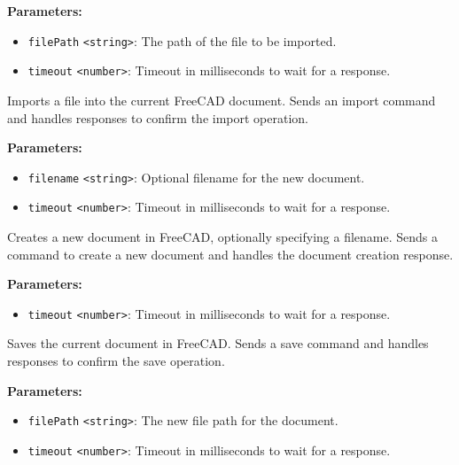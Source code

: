 \documentclass[12pt,a4paper]{article}
\begin{document}
\noindent \textbf{Parameters:}
\begin{itemize}
  \item \texttt{filePath} \texttt{<string>}: The path of the file to be imported.
  \item \texttt{timeout} \texttt{<number>}: Timeout in milliseconds to wait for a response.
\end{itemize}

\noindent Imports a file into the current FreeCAD document.
Sends an import command and handles responses to confirm the import operation.

\vspace{5mm}
\noindent {}


\noindent \textbf{Parameters:}
\begin{itemize}
  \item \texttt{filename} \texttt{<string>}: Optional filename for the new document.
  \item \texttt{timeout} \texttt{<number>}: Timeout in milliseconds to wait for a response.
\end{itemize}

\noindent Creates a new document in FreeCAD, optionally specifying a filename.
Sends a command to create a new document and handles the document creation response.

\vspace{5mm}
\noindent {}


\noindent \textbf{Parameters:}
\begin{itemize}
  \item \texttt{timeout} \texttt{<number>}: Timeout in milliseconds to wait for a response.
\end{itemize}

\noindent Saves the current document in FreeCAD.
Sends a save command and handles responses to confirm the save operation.

\vspace{5mm}
\noindent {}


\noindent \textbf{Parameters:}
\begin{itemize}
  \item \texttt{filePath} \texttt{<string>}: The new file path for the document.
  \item \texttt{timeout} \texttt{<number>}: Timeout in milliseconds to wait for a response.
\end{itemize}
\end{document}
